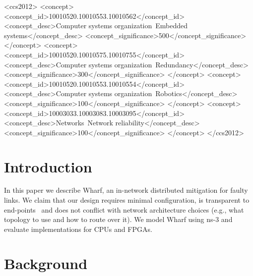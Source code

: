 \documentclass[sigconf]{acmart}
\newcommand{\OurSys}{Wharf\xspace}
\begin{document}
%
%
\begin{CCSXML}
<ccs2012>
 <concept>
  <concept_id>10010520.10010553.10010562</concept_id>
  <concept_desc>Computer systems organization~Embedded systems</concept_desc>
  <concept_significance>500</concept_significance>
 </concept>
 <concept>
  <concept_id>10010520.10010575.10010755</concept_id>
  <concept_desc>Computer systems organization~Redundancy</concept_desc>
  <concept_significance>300</concept_significance>
 </concept>
 <concept>
  <concept_id>10010520.10010553.10010554</concept_id>
  <concept_desc>Computer systems organization~Robotics</concept_desc>
  <concept_significance>100</concept_significance>
 </concept>
 <concept>
  <concept_id>10003033.10003083.10003095</concept_id>
  <concept_desc>Networks~Network reliability</concept_desc>
  <concept_significance>100</concept_significance>
 </concept>
</ccs2012>  
\end{CCSXML}





\maketitle

\section{Introduction}

In this paper we describe \OurSys, an in-network distributed mitigation for
faulty links.  We claim that our design requires minimal configuration, is
transparent to end-points~\cite{Saltzer84end-to-endarguments} and does not
conflict with network architecture choices (e.g., what topology to use and how
to route over it). We model \OurSys using ns-3 and evaluate implementations
for CPUs and FPGAs.


\section{Background}
\end{document}
